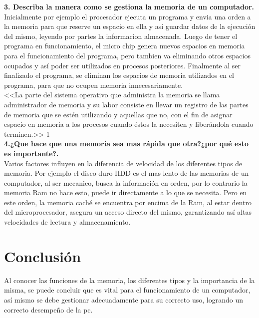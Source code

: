 \documentclass{article}
\begin{document}
\textbf{3. Describa la manera como se gestiona la memoria de un computador.}\vspace{0.5cm} \\


Inicialmente por ejemplo el procesador ejecuta un programa y envia una orden a la memoria para que reserve un espacio en ella y así guardar datos de la ejecución del mismo, leyendo por partes la informacion almacenada. Luego de tener el programa en funcionamiento, el micro chip genera nuevos espacios en memoria para el funcionamiento del programa, pero tambien va eliminando otros espacios ocupados y así poder ser utilizados en procesos posteriores. Finalmente al ser finalizado el programa, se eliminan los espacios de memoria utilizados en el programa, para que no ocupen memoria innecesariamente.\vspace{0.5cm} \\

<<La parte del sistema operativo que administra la memoria se llama administrador de memoria y su labor consiste en llevar un registro de las partes de memoria que se estén utilizando y aquellas que no, con el fin de asignar espacio en memoria a los procesos cuando éstos la necesiten y liberándola cuando terminen.>> 1 \vspace{0.5cm} \\

\textbf{4.¿Que hace que una memoria sea mas rápida que otra?¿por qué esto es importante?.} \vspace{0.5cm} \\

Varios factores influyen en la diferencia de velocidad de los diferentes tipos de memoria. Por ejemplo el disco duro HDD es el mas lento de las memorias de un computador, al ser mecanico, busca la información en orden, por lo contrario la memoria Ram no hace esto, puede ir directamente a lo que se necesita. Pero en este orden, la memoria caché se encuentra por encima de la Ram, al estar dentro del microprocesador, asegura un acceso directo del mismo, garantizando así altas velocidades de lectura y almacenamiento. \vspace{2cm} \\ 



\section{Conclusión} \label{conclulsion}

Al conocer las funciones de la memoria, los diferentes tipos y la importancia de la misma, se puede concluir que es vital para el funcionamiento de un computador, así mismo se debe gestionar adecuadamente para su correcto uso, logrando un correcto desempeño de la pc. \vspace{2cm} \\
\end{document}
